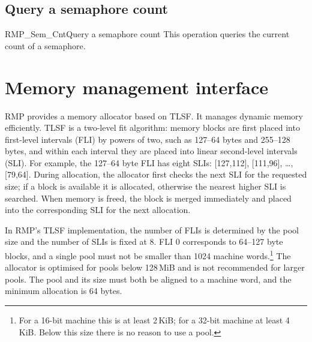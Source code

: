 \subsection{Query a semaphore count}
\begin{apidesc}{RMP\_Sem\_Cnt}{Query a semaphore count}\label{api:RMP_Sem_Cnt}
    This operation queries the current count of a semaphore.
    \begin{apiparams}
    \end{apiparams}
    \begin{apiret}
    \end{apiret}
\end{apidesc}

\section{Memory management interface}

RMP provides a memory allocator based on TLSF.
It manages dynamic memory efficiently.
TLSF is a two-level fit algorithm: memory blocks are first placed into first-level intervals (FLI) by powers of two, such as 127--64 bytes and 255--128 bytes, and within each interval they are placed into linear second-level intervals (SLI).
For example, the 127--64 byte FLI has eight SLIs: [127,112], [111,96], \ldots, [79,64].
During allocation, the allocator first checks the next SLI for the requested size; if a block is available it is allocated, otherwise the nearest higher SLI is searched.
When memory is freed, the block is merged immediately and placed into the corresponding SLI for the next allocation.

In RMP's TLSF implementation, the number of FLIs is determined by the pool size and the number of SLIs is fixed at 8.
FLI 0 corresponds to 64--127 byte blocks, and a single pool must not be smaller than 1024 machine words.\footnote{For a 16-bit machine this is at least 2\,KiB; for a 32-bit machine at least 4\,KiB. Below this size there is no reason to use a pool.}
The allocator is optimised for pools below 128\,MiB and is not recommended for larger pools.
The pool and its size must both be aligned to a machine word, and the minimum allocation is 64 bytes.

